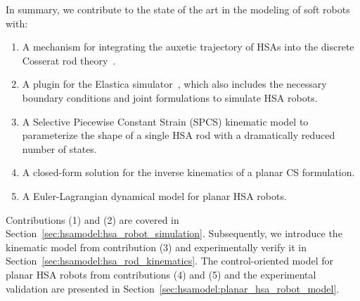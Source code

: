 In summary, we contribute to the state of the art in the modeling of soft robots with:
%
\begin{enumerate}
    \item A mechanism for integrating the auxetic trajectory of \glspl{HSA} into the discrete Cosserat rod theory~\citep{gazzola2018forward, mathew2022sorosim}. %
    \item A plugin for the Elastica simulator~\citep{naughton2021elastica}, which also includes the necessary boundary conditions and joint formulations to simulate \gls{HSA} robots.
    \item A Selective Piecewise Constant Strain (SPCS) kinematic model to parameterize the shape of a single \gls{HSA} rod with a dramatically reduced number of states. %
    \item A closed-form solution for the inverse kinematics of a planar \gls{CS} formulation.
    \item A Euler-Lagrangian dynamical model for planar \gls{HSA} robots.
\end{enumerate}
Contributions (1) and (2) are covered in Section~\ref{sec:hsamodel:hsa_robot_simulation}. Subsequently, we introduce the kinematic model from contribution (3) and experimentally verify it in Section~\ref{sec:hsamodel:hsa_rod_kinematics}. The control-oriented model for planar \gls{HSA} robots from contributions (4) and (5) and the experimental validation are presented in Section~\ref{sec:hsamodel:planar_hsa_robot_model}.